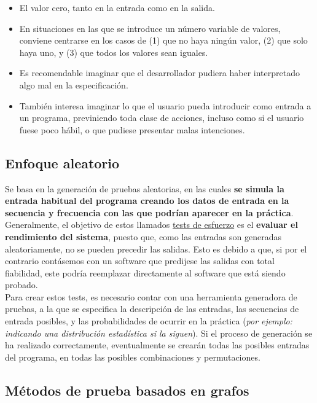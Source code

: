 \begin{itemize}
    \item El valor cero, tanto en la entrada como en la salida.
    \item En situaciones en las que se introduce un número variable de valores, conviene centrarse en los casos de (1) que no haya ningún valor, (2) que solo haya uno, y (3) que todos los valores sean iguales.
    \item Es recomendable imaginar que el desarrollador pudiera haber interpretado algo mal en la especificación.
    \item También interesa imaginar lo que el usuario pueda introducir como entrada a un programa, previniendo toda clase de acciones, incluso como si el usuario fuese poco hábil, o que pudiese presentar malas intenciones.
\end{itemize}

\subsection{Enfoque aleatorio}

Se basa en la generación de pruebas aleatorias, en las cuales \textbf{se simula la entrada habitual del programa creando los datos de entrada en la secuencia y frecuencia con las que podrían aparecer en la práctica}. Generalmente, el objetivo de estos llamados \uline{tests de esfuerzo} es el \textbf{evaluar el rendimiento del sistema}, puesto que, como las entradas son generadas aleatoriamente, no se pueden precedir las salidas. Esto es debido a que, si por el contrario contásemos con un software que predijese las salidas con total fiabilidad, este podría reemplazar directamente al software que está siendo probado.\\

Para crear estos tests, es necesario contar con una herramienta generadora de pruebas, a la que se especifica la descripción de las entradas, las secuencias de entrada posibles, y las probabilidades de ocurrir en la práctica (\textit{por ejemplo: indicando una distribución estadística si la siguen}). Si el proceso de generación se ha realizado correctamente, eventualmente se crearán todas las posibles entradas del programa, en todas las posibles combinaciones y permutaciones. 

\subsection{Métodos de prueba basados en grafos}

